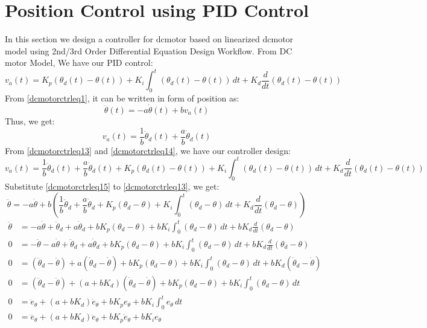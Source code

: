 \section{Position Control using PID Control}
In this section we design a controller for dcmotor based on linearized dcmotor model using 2nd/3rd Order Differential Equation Design Workflow. From DC motor Model, We have our PID control:
\begin{equation}
	\label{dcmotorctrleq12}
	v_a(t) = K_p(\theta_d(t) - \theta(t)) + K_i \int_{0}^{t} (\theta_d(t) - \theta(t)) \,dt + K_d \frac{d}{dt} (\theta_d(t) - \theta(t))
\end{equation}
From \autoref{dcmotorctrleq1}, it can be written in form of position as:
\begin{equation}
	\label{dcmotorctrleq13}
	\ddot{\theta}(t) = -a\dot{\theta}(t) + bv_a(t) 
\end{equation}
Thus, we get:
\begin{equation}
	\label{dcmotorctrleq14}
	v_a(t) = \frac{1}{b}\ddot{\theta}_d(t) + \frac{a}{b}\dot{\theta}_d(t)
\end{equation}
From \autoref{dcmotorctrleq13} and \autoref{dcmotorctrleq14}, we have our controller design:
\begin{equation}
	\label{dcmotorctrleq15}
	v_a(t) = \frac{1}{b}\ddot{\theta}_d(t) + \frac{a}{b}\dot{\theta}_d(t) + K_p(\theta_d(t) - \theta(t)) + K_i \int_{0}^{t} (\theta_d(t) - \theta(t)) \,dt + K_d \frac{d}{dt} (\theta_d(t) - \theta(t))
\end{equation}
Substitute \autoref{dcmotorctrleq15} to \autoref{dcmotorctrleq13}, we get:
\begin{equation}
	\label{dcmotorctrleq16}
	\ddot{\theta} = -a\dot{\theta} + b\left(\frac{1}{b}\ddot{\theta}_d + \frac{a}{b}\dot{\theta}_d + K_p(\theta_d - \theta) + K_i \int_{0}^{t} (\theta_d - \theta) \,dt + K_d \frac{d}{dt} (\theta_d - \theta)\right)
\end{equation}
\[
\begin{split}
	\ddot{\theta} &= -a\dot{\theta} + \ddot{\theta}_d + a\dot{\theta}_d + bK_p(\theta_d - \theta) + bK_i \int_{0}^{t} (\theta_d - \theta) \,dt + bK_d \frac{d}{dt} (\theta_d - \theta) \\
	0 &= -\ddot{\theta} -a\dot{\theta} + \ddot{\theta}_d + a\dot{\theta}_d + bK_p(\theta_d - \theta) + bK_i \int_{0}^{t} (\theta_d - \theta) \,dt + bK_d \frac{d}{dt} (\theta_d - \theta) \\
	0 &= (\ddot{\theta}_d -\ddot{\theta}) +a(\dot{\theta}_d -\dot{\theta}) + bK_p(\theta_d - \theta) + bK_i \int_{0}^{t} (\theta_d - \theta) \,dt + bK_d (\dot{\theta}_d -\dot{\theta}) \\
	0 &= (\ddot{\theta}_d -\ddot{\theta}) +(a+bK_d)(\dot{\theta}_d -\dot{\theta}) + bK_p(\theta_d - \theta) + bK_i \int_{0}^{t} (\theta_d - \theta) \,dt \\
	0 &= \ddot{e}_{\theta} +(a+bK_d) \dot{e}_{\theta} + bK_pe_{\theta} + bK_i \int_{0}^{t} e_{\theta} \,dt \\
	0 &= \dddot{e}_{\theta} +(a+bK_d) \ddot{e}_{\theta} + bK_p\dot{e}_{\theta} + bK_ie_{\theta} \\
\end{split}
\]
